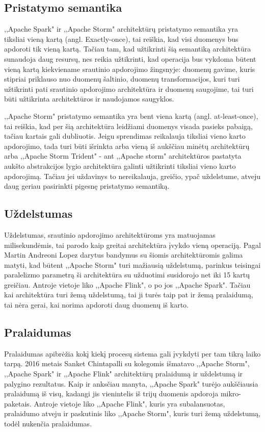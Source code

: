 \documentclass{VUMIFPSkursinis}
\begin{document}
\subsection{Pristatymo semantika}
,,Apache Spark" ir ,,Apache Storm" architektūrų pristatymo semantika yra tiksliai vieną kartą (angl. Exactly-once), tai reiškia, kad visi 
duomenys bus apdoroti tik vieną kartą. Tačiau tam, kad užtikrinti šią semantiką architektūra sunaudoja daug resursų, nes reikia užtikrinti, kad 
operacija bus vykdoma būtent vieną kartą kiekviename srautinio apdorojimo žingsnyje: duomenų gavime, kuris stipriai priklauso nuo duomenų šaltinio,
duomenų transformacijos, kuri turi užtikrinti pati srautinio apdorojimo architektūra ir duomenų saugojime, tai turi būti užtikrinta architektūros ir
naudojamos saugyklos\cite{zhang20}.\par
    ,,Apache Storm" pristatymo semantika yra bent viena kartą (angl. at-least-once), tai reiškia, kad per šią architektūra leidžiami duomenys 
visada pasieks pabaigą, tačiau kartais gali dubliuotis\cite{prithi20}. Jeigu sprendimas reikalauja tiksliai vieno karto apdorojimo, tada turi būti išrinkta
 arba vieną iš aukščiau minėtų architektūrų arba ,,Apache Storm Trident" - ant ,,Apache storm" architektūros pastatyta aukšto abstrakcijos lygio architektūra 
galinti užtikrinti tiksliai vieno karto apdorojimą. Tačiau jei uždavinys to nereikalauja, greičio, ypač uždelstume, atveju daug geriau pasirinkti 
pigesnę pristatymo semantiką\cite{zhang20}.
\subsection{Uždelstumas}
    Uždelstumas, srautinio apdorojimo architektūroms yra matuojamas milisekundėmis, tai parodo kaip greitai architektūra įvykdo vieną operaciją. 
Pagal Martin Andreoni Lopez darytus bandymus su šiomis architektūromis galima matyti, kad būtent ,,Apache Storm" turi mažiausią uždelstumą,
parinkus teisingai paralelizmo parametrą ši architektūra su užduotimi susidorojo net iki 15 kartų greičiau. Antroje vietoje liko ,,Apache Flink", o po jos
,,Apache Spark"\cite{Lopez2016APC}. Tačiau kai architektūra turi žemą uždelstumą, tai ji turės taip pat ir žemą pralaidumą, tai nėra gerai, 
kai norima apdoroti daug duomenų iš karto.

\subsection{Pralaidumas}
    Pralaidumas apibrėžia kokį kiekį procesų sistema gali įvykdyti per tam tikrą laiko tarpą. 2016 metais Sanket Chintapalli su kolegomis išmatavo ,,Apache Storm",
,,Apache Spark" ir ,,Apache Flink" architektūrų pralaidumą ir uždelstumą ir palygino rezultatus. Kaip ir anksčiau manyta, ,,Apache Spark" turėjo aukščiausia 
pralaidumą iš visų, kadangi jis vienintelis iš trijų duomenis apdoroja mikro-paketais. Antroje vietoje liko ,,Apache Flink", kuris yra subalansuotas,
pralaidumo atveju ir paskutinis liko ,,Apache Storm", kuris turi žemą uždelstumą, todėl nukenčia pralaidumas\cite{chintapalli2016benchmarking}.
\end{document}
